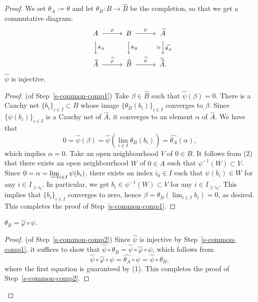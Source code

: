 \begin{proof}
We set $\theta_A:=\theta$ and let 
$\theta_B:B \to \widehat{B}$ be the completion, 
so that we get a commutative diagram: 
$$\begin{CD}
A @>\varphi >> B @>\psi >> \widehat{A}\\
@VV\theta_A V @VV\theta_B V @V\simeq V \widehat{\theta_A}V\\
\widehat{A} @>\widehat{\varphi}>> \widehat{B} @>\widehat{\psi} >> \widehat{\widehat{A}}.
\end{CD}$$

\begin{step}\label{s-common-comp1}
$\widehat{\psi}$ is injective. 
\end{step}

\begin{proof}(of Step~\ref{s-common-comp1}) 
Take $\beta \in \widehat{B}$ such that $\widehat{\psi}(\beta)=0$. 
There is a Cauchy net $\{b_i\}_{i \in I} \subset B$ whose image 
$\{\theta_B(b_i)\}_{i \in I}$ converges to $\beta$. 
Since $\{\psi(b_i)\}_{i \in I}$ is a Cauchy net of $\widehat{A}$, 
it converges to an element $\alpha$ of $\widehat{A}$. 
We have that 
$$0=\widehat{\psi}(\beta)=\widehat{\psi}(\lim_{i \in I} \theta_{B}(b_i))
=\widehat{\theta_A}(\alpha),$$
which implies $\alpha=0$. 
Take an open neighbourhood $V$ of $0 \in B$. 
It follows from (2) that there exists an open neighbourhood $W$ 
of $0 \in \widehat{A}$ such that $\psi^{-1}(W) \subset V$. 
Since $0=\alpha=\varinjlim_{i \in I}\psi(b_i)$, 
there exists an index $i_0 \in I$ such that $\psi(b_i) \in W$ 
for any $i \in I_{\geq i_0}$. 
In particular, 
we get $b_i \in \psi^{-1}(W) \subset V$ for any $i \in I_{\geq i_0}$. 
This implies that $\{b_i\}_{i \in I}$ converges to zero, 
hence $\beta=\theta_B(\lim_{i \in I} b_i)=0$, as desired. 
This completes the proof of Step~\ref{s-common-comp1}. 
\end{proof}


\begin{step}\label{s-common-comp2}
$\theta_B=\widehat{\varphi} \circ \psi$.
\end{step}

\begin{proof}(of Step~\ref{s-common-comp2}) 
Since $\widehat{\psi}$ is injective by Step~\ref{s-common-comp1}, 
it suffices to show that 
$\widehat{\psi} \circ \theta_B=\widehat{\psi} \circ 
\widehat{\varphi} \circ \psi$, which follows from 
$$\widehat{\psi} \circ 
\widehat{\varphi} \circ \psi=\widehat{\theta_A} \circ \psi=\widehat{\psi} \circ \theta_B,$$
where the first equation is guaranteed by (1). 
This completes the proof of Step~\ref{s-common-comp2}.
\end{proof}


\end{proof}
